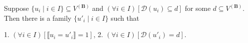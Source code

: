 Suppose $\{u_i \mid i \in I\} \subseteq V^{(\mathbf{B})}$ and $(\forall i \in I)[\mathcal{D}(u_i) \subseteq d]$ for some $d \subseteq V^{(\mathbf{B})}$. Then there is a family $\{u'_i \mid i \in I\}$ such that

1. $(\forall i \in I)[\llbracket u_i = u'_i \rrbracket = 1]$,
2. $(\forall i \in I)[\mathcal{D}(u'_i) = d]$.
